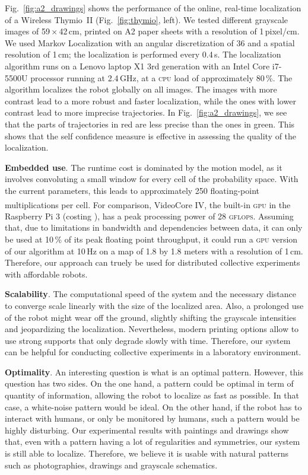 \documentclass{svmult}
\newcommand{\fig}[1]{Fig.~\ref{fig:#1}}
\newcommand{\Fig}[1]{Fig.~\ref{fig:#1}}
\begin{document}
\Fig{a2_drawings} shows the performance of the online, real-time localization of a Wireless Thymio~II (\fig{thymio}, left).
We tested different grayscale images of 59\,$\times$\,42\,cm, printed on A2 paper sheets with a resolution of 1\,pixel/cm.
We used Markov Localization with an angular discretization of 36 and a spatial resolution of 1\,cm; the localization is performed every 0.4\,s.
The localization algorithm runs on a Lenovo laptop X1 3rd generation with an Intel Core i7-5500U processor running at 2.4\,GHz, at a \textsc{cpu} load of approximately 80\,\%.
The algorithm localizes the robot globally on all images.
The images with more contrast lead to a more robust and faster localization, while the ones with lower contrast lead to more imprecise trajectories.
In \fig{a2_drawings}, we see that the parts of trajectories in red are less precise than the ones in green.
This shows that the self confidence measure is effective in assessing the quality of the localization.

\textbf{Embedded use}.
The runtime cost is dominated by the motion model, as it involves convoluting a small window for every cell of the probability space.
With the current parameters, this leads to approximately 250 floating-point multiplications per cell.
For comparison, VideoCore\textsuperscript{\textregistered} IV, the built-in \textsc{gpu} in the Raspberry Pi 3 (costing ), has a peak processing power of 28 \textsc{gflops}.
Assuming that, due to limitations in bandwidth and dependencies between data, it can only be used at 10\,\% of its peak floating point throughput, it could run a \textsc{gpu} version of our algorithm at 10\,Hz on a map of 1.8 by 1.8 meters with a resolution of 1\,cm.
Therefore, our approach can truely be used for distributed collective experiments with affordable robots.

\textbf{Scalability}.
The computational speed of the system and the necessary distance to converge scale linearly with the size of the localized area.
Also, a prolonged use of the robot might wear off the ground, slightly shifting the grayscale intensities and jeopardizing the localization.
Nevertheless, modern printing options allow to use strong supports that only degrade slowly with time.
Therefore, our system can be helpful for conducting collective experiments in a laboratory environment.

\textbf{Optimality}.
An interesting question is what is an optimal pattern.
However, this question has two sides.
On the one hand, a pattern could be optimal in term of quantity of information, allowing the robot to localize as fast as possible.
In that case, a white-noise pattern would be ideal.
On the other hand, if the robot has to interact with humans, or only be monitored by humans, such a pattern would be highly disturbing.
Our experimental results with paintings and drawings show that, even with a pattern having a lot of regularities and symmetries, our system is still able to localize.
Therefore, we believe it is usable with natural patterns such as photographies, drawings and grayscale schematics.
\end{document}
